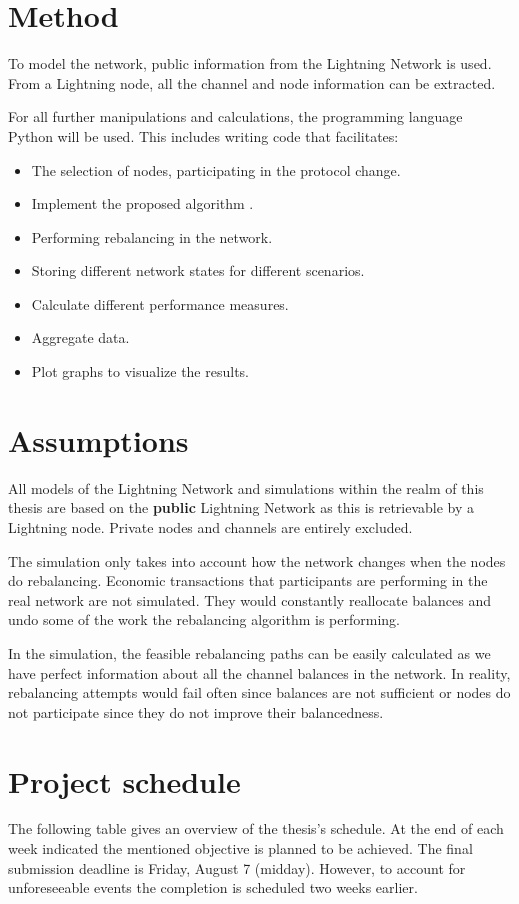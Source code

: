 \documentclass[final]{fhnwreport}       %
\begin{document}
\section{Method}

To model the network, public information from the Lightning Network is used. From a Lightning node, all the channel and node information can be extracted.

For all further manipulations and calculations, the programming language Python will be used. This includes writing code that facilitates: 
\begin{itemize}
  \item The selection of nodes, participating in the protocol change.
  \item Implement the proposed algorithm \cite[p.~3]{pickhardt_imbalance_2019}.
  \item Performing rebalancing in the network.
  \item Storing different network states for different scenarios.
  \item Calculate different performance measures.
  \item Aggregate data.
  \item Plot graphs to visualize the results.
\end{itemize}

\section{Assumptions}
All models of the Lightning Network and simulations within the realm of this thesis are based on the \textbf{public} Lightning Network as this is retrievable by a Lightning node. Private nodes and channels are entirely excluded.

The simulation only takes into account how the network changes when the nodes do rebalancing. Economic transactions that participants are performing in the real network are not simulated. They would constantly reallocate balances and undo some of the work the rebalancing algorithm is performing.

In the simulation, the feasible rebalancing paths can be easily calculated as we have perfect information about all the channel balances in the network. In reality, rebalancing attempts would fail often since balances are not sufficient or nodes do not participate since they do not improve their balancedness.

\section{Project schedule}
The following table gives an overview of the thesis's schedule. At the end of each week indicated the mentioned objective is planned to be achieved. The final submission deadline is Friday, August 7 (midday). However, to account for unforeseeable events the completion is scheduled two weeks earlier.
\end{document}
